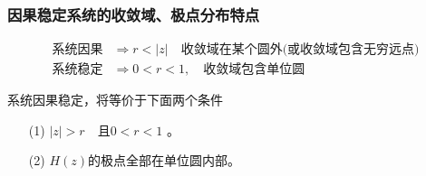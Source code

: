 \documentclass[notheorems,compress,mathserif,table]{beamer}
\begin{document}
\begin{frame}[shrink]\frametitle{因果稳定系统的收敛域、极点分布特点}%
\begin{equation*}
\begin{split}
\mbox{系统因果} &\Rightarrow  r<|z| \quad \mbox{收敛域在某个圆外(或收敛域包含无穷远点)}\\
\mbox{系统稳定} &\Rightarrow    0 <r<1,     \quad \mbox{收敛域包含单位圆}
\end{split}
\end{equation*}

系统因果稳定，将等价于下面两个条件
\begin{enumerate}
\item [(1)] $|z|>r\quad\mbox{且} 0 <r<1 $ 。
\item [(2)] $H(z)$的极点全部在单位圆内部。
\end{enumerate}

\end{frame}






\end{document}
